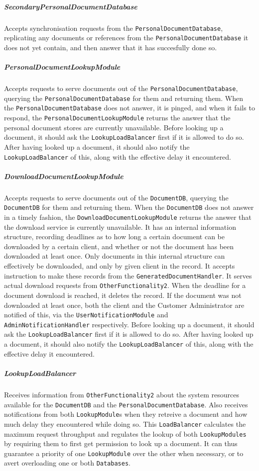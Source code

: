 \documentclass[a4paper,10pt]{article}
\begin{document}
\subparagraph{SecondaryPersonalDocumentDatabase}
Accepts synchronisation requests from the \texttt{PersonalDocumentDatabase}, replicating any documents or references from the \texttt{PersonalDocumentDatabase} it does not yet contain, and then answer that it has succesfully done so.

\subparagraph{PersonalDocumentLookupModule}
Accepts requests to serve documents out of the \texttt{PersonalDocumentDatabase}, querying the \texttt{PersonalDocumentDatabase} for them and returning them. When the \texttt{PersonalDocumentDatabase} does not answer, it is pinged, and when it fails to respond, the \texttt{PersonalDocumentLookupModule} returns the answer that the personal document stores are currently unavailable. Before looking up a document, it should ask the \texttt{LookupLoadBalancer} first if it is allowed to do so. After having looked up a document, it should also notify the \texttt{LookupLoadBalancer} of this, along with the effective delay it encountered.

\subparagraph{DownloadDocumentLookupModule}
Accepts requests to serve documents out of the \texttt{DocumentDB}, querying the \texttt{DocumentDB} for them and returning them. When the \texttt{DocumentDB} does not answer in a timely fashion, the \texttt{DownloadDocumentLookupModule} returns the answer that the download service is currently unavailable. It has an internal information structure, recording deadlines as to how long a certain document can be downloaded by a certain client, and whether or not the document has been downloaded at least once. Only documents in this internal structure can effectively be downloaded, and only by given client in the record. It accepts instruction to make these records from the \texttt{GeneratedDocumentHandler}. It serves actual download requests from \texttt{OtherFunctionality2}. When the deadline for a document download is reached, it deletes the record. If the document was not downloaded at least once, both the client and the Customer Administrator are notified of this, via the \texttt{UserNotificationModule} and \texttt{AdminNotificationHandler} respectively. Before looking up a document, it should ask the \texttt{LookupLoadBalancer} first if it is allowed to do so. After having looked up a document, it should also notify the \texttt{LookupLoadBalancer} of this, along with the effective delay it encountered.

\subparagraph{LookupLoadBalancer}
Receives information from \texttt{OtherFunctionality2} about the system resources available for the \texttt{DocumentDB} and the \texttt{PersonalDocumentDatabase}. Also receives notifications from both \texttt{LookupModule}s when they retreive a document and how much delay they encountered while doing so. This \texttt{LoadBalancer} calculates the maximum request throughput and regulates the lookup of both \texttt{LookupModules} by requiring them to first get permission to look up a document. It can thus guarantee a priority of one \texttt{LookupModule} over the other when necessary, or to avert overloading one or both \texttt{Databases}.
\end{document}

